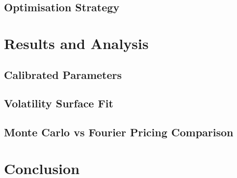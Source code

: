 \documentclass[11pt, a4paper]{article}
\numberwithin{equation}{subsection}
\numberwithin{definition}{subsection}
\numberwithin{theorem}{subsection}
\numberwithin{remark}{subsection}
\begin{document}
\subsection{Optimisation Strategy}


\section{Results and Analysis}

\subsection{Calibrated Parameters}

\subsection{Volatility Surface Fit}

\subsection{Monte Carlo vs Fourier Pricing Comparison}


\section{Conclusion}


\printbibliography
\end{document}

